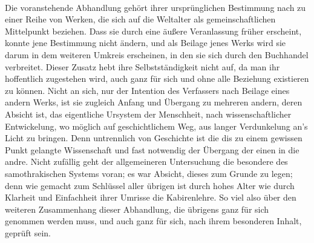 \documentclass[a4paper, 11pt, oneside]{article}
\begin{document}
\paragraph{}
Die voranstehende Abhandlung gehört ihrer ursprünglichen Bestimmung nach zu einer Reihe von Werken, die sich auf die Weltalter als gemeinschaftlichen Mittelpunkt beziehen. Dass sie durch eine äußere Veranlassung früher erscheint, konnte jene Bestimmung nicht ändern, und als Beilage jenes Werks wird sie darum in dem weiteren Umkreis erscheinen, in den sie sich durch den Buchhandel verbreitet. Dieser Zusatz hebt ihre Selbstständigkeit nicht auf, da man ihr hoffentlich zugestehen wird, auch ganz für sich und ohne alle Beziehung existieren zu können. Nicht an sich, nur der Intention des Verfassers nach Beilage eines andern Werks, ist sie zugleich Anfang und Übergang zu mehreren andern, deren Absicht ist, das eigentliche Ursystem der Menschheit, nach wissenschaftlicher Entwickelung, wo möglich auf geschichtlichem Weg, aus langer Verdunkelung an's Licht zu bringen. Denn untrennlich von Geschichte ist die dis zu einem gewissen Punkt gelangte Wissenschaft und fast notwendig der Übergang der einen in die andre. Nicht zufällig geht der allgemeineren Untersuchung die besondere des samothrakischen Systems voran; es war Absicht, dieses zum Grunde zu legen; denn wie gemacht zum Schlüssel aller übrigen ist durch hohes Alter wie durch Klarheit und Einfachheit ihrer Umrisse die Kabirenlehre. So viel also über den weiteren Zusammenhang dieser Abhandlung, die übrigens ganz für sich genommen werden muss, und auch ganz für sich, nach ihrem besonderen Inhalt, geprüft sein.
\end{document}
